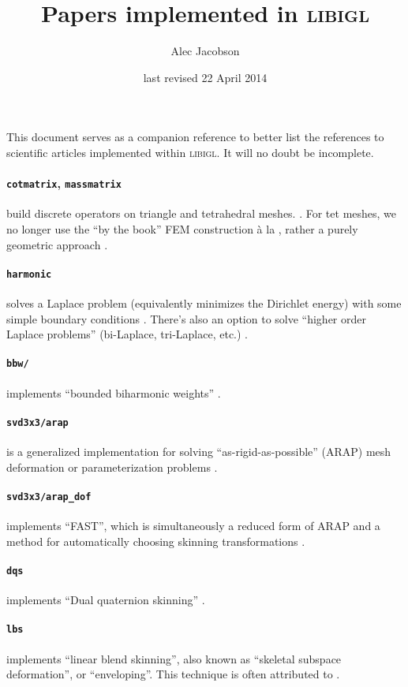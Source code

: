 \documentclass[12pt]{diary}
\title{Papers implemented in \textsc{libigl}}
\author{Alec Jacobson}
\date{last revised 22 April 2014}
\begin{document}
This document serves as a companion reference to better list the references to
scientific articles implemented within \textsc{libigl}. It will no doubt be
incomplete.

\paragraph{\texttt{cotmatrix}, \texttt{massmatrix}}
build discrete operators on triangle and tetrahedral meshes. 
\cite{Pinkall:1993:CDM,meyer03ddo,Jacobson:THESIS:2013}. For tet meshes, we no
longer use the ``by the book'' FEM construction \`a la \cite{Sharf:2007vv},
rather a purely geometric approach \cite{Barth:1994,Xu:1999}.

\paragraph{\texttt{harmonic}} solves a Laplace problem (equivalently
minimizes the Dirichlet energy) with some simple boundary conditions
\cite{HarmonicCoodinates07}. There's also an option to solve
``higher order Laplace problems'' (bi-Laplace, tri-Laplace, etc.)
\cite{Botsch:2004:AIF,sorkine04lsm,Jacobson:MixedFEM:2010}.

\paragraph{\texttt{bbw/}} implements ``bounded biharmonic
weights'' \cite{Jacobson:BBW:2011}.

\paragraph{\texttt{svd3x3/arap}} is a generalized implementation
for solving ``as-rigid-as-possible'' (ARAP) mesh deformation or parameterization
problems \cite{ARAP_modeling:2007,Liu:2008:ALA,Chao:2010:ASG}.

\paragraph{\texttt{svd3x3/arap\_dof}} implements ``FAST'',
which is simultaneously a reduced form of ARAP and a method for automatically
choosing skinning transformations \cite{Jacobson:FAST:2012}.

\paragraph{\texttt{dqs}} implements ``Dual quaternion skinning''
\cite{Kavan:2008:GSW}.

\paragraph{\texttt{lbs}} implements ``linear blend skinning'', also known as
``skeletal subspace deformation'', or ``enveloping''. This technique is often
attributed to \cite{Magnenat-Thalmann:1988:JLD}.


 
\end{document}
